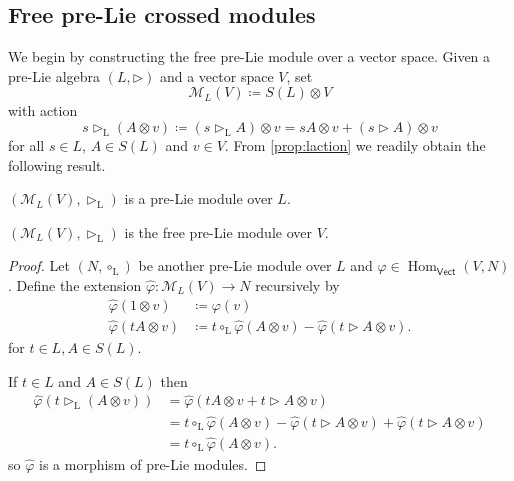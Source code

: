 \documentclass[noamsfonts, reqno]{amsart}
\newcommand{\prelie}{\mathbin{\vartriangleright}}
\newcommand{\laction}{\mathbin{\vartriangleright_{\mathrm{L}}}}
\begin{document}
\subsection{Free pre-Lie crossed modules}
We begin by constructing the free pre-Lie module over a vector space.
Given a pre-Lie algebra \((L, \prelie)\) and a vector space \(V\), set
\[
  \mathcal{M}_L(V)\coloneqq S(L)\otimes V
\]
with action
\[
  s\laction(A\otimes v)\coloneqq (s\laction A)\otimes v = sA\otimes v + (s\prelie A)\otimes v
\]
for all \(s\in L\), \(A\in S(L)\) and \(v\in V\).
From \cref{prop:laction} we readily obtain the following result.
\begin{proposition}\label{prop:MLV.left}
  \((\mathcal{M}_L(V),\laction)\) is a pre-Lie module over \(L\).
\end{proposition}
\begin{theorem}
  \((\mathcal{M}_L(V),\laction)\) is the free pre-Lie module over \(V\).
\end{theorem}
\begin{proof}
  Let \((N,\circ_{\mathrm{L}})\) be another pre-Lie module over \(L\) and \(\varphi\in \operatorname{Hom}_{\mathsf{Vect}}(V,N)\).
  Define the extension \(\hat{\varphi}\colon \mathcal{M}_L(V)\to N\) recursively by
  \begin{align*}
    \hat{\varphi}(1\otimes v) &\coloneqq \varphi(v)\\
    \hat{\varphi}(tA\otimes v) &\coloneqq t\circ_{\mathrm{L}}\hat{\varphi}(A\otimes v) - \hat{\varphi}(t\prelie A\otimes v).
  \end{align*}
  for \(t\in L, A\in S(L)\).

  If \(t\in L\) and \(A\in S(L)\) then
  \begin{align*}
    \hat{\varphi}(t\laction (A\otimes v)) &= \hat{\varphi}\left( tA\otimes v + t\prelie A\otimes v \right)\\
                                          &= t\circ_{\mathrm{L}}\hat{\varphi}(A\otimes v) - \hat{\varphi}(t\prelie A\otimes v) + \hat{\varphi}(t\prelie A\otimes v) \\
                                          &= t\circ_{\mathrm{L}}\hat{\varphi}(A\otimes v).
  \end{align*}
  so \(\hat{\varphi}\) is a morphism of pre-Lie modules.
\end{proof}
\end{document}
